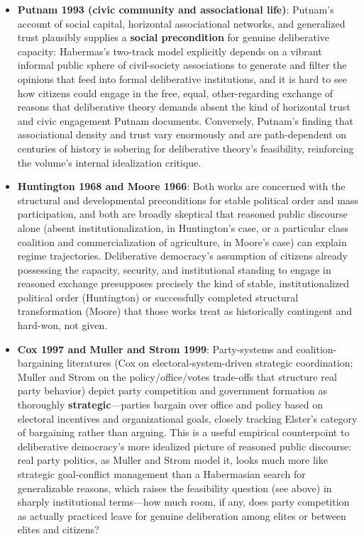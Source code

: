 \documentclass[12pt]{article}
\begin{document}
\begin{itemize}[leftmargin=*, itemsep=4pt]
    \item \textbf{Putnam 1993 (civic community and associational life)}: Putnam's account of social capital, horizontal associational networks, and generalized trust plausibly supplies a \textbf{social precondition} for genuine deliberative capacity: Habermas's two-track model explicitly depends on a vibrant informal public sphere of civil-society associations to generate and filter the opinions that feed into formal deliberative institutions, and it is hard to see how citizens could engage in the free, equal, other-regarding exchange of reasons that deliberative theory demands absent the kind of horizontal trust and civic engagement Putnam documents. Conversely, Putnam's finding that associational density and trust vary enormously and are path-dependent on centuries of history is sobering for deliberative theory's feasibility, reinforcing the volume's internal idealization critique.
    \item \textbf{Huntington 1968 and Moore 1966}: Both works are concerned with the structural and developmental preconditions for stable political order and mass participation, and both are broadly skeptical that reasoned public discourse alone (absent institutionalization, in Huntington's case, or a particular class coalition and commercialization of agriculture, in Moore's case) can explain regime trajectories. Deliberative democracy's assumption of citizens already possessing the capacity, security, and institutional standing to engage in reasoned exchange presupposes precisely the kind of stable, institutionalized political order (Huntington) or successfully completed structural transformation (Moore) that those works treat as historically contingent and hard-won, not given.
    \item \textbf{Cox 1997 and Muller and Strom 1999}: Party-systems and coalition-bargaining literatures (Cox on electoral-system-driven strategic coordination; Muller and Strom on the policy/office/votes trade-offs that structure real party behavior) depict party competition and government formation as thoroughly \textbf{strategic}---parties bargain over office and policy based on electoral incentives and organizational goals, closely tracking Elster's category of bargaining rather than arguing. This is a useful empirical counterpoint to deliberative democracy's more idealized picture of reasoned public discourse: real party politics, as Muller and Strom model it, looks much more like strategic goal-conflict management than a Habermasian search for generalizable reasons, which raises the feasibility question (see above) in sharply institutional terms---how much room, if any, does party competition as actually practiced leave for genuine deliberation among elites or between elites and citizens?

\end{itemize}
\end{document}
